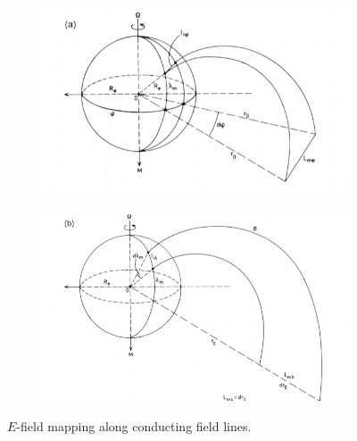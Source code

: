 \begin{figure}[t]
    \centering

    \begin{subfigure}[t]{.49\linewidth}
        \includegraphics[width=.95\linewidth]{bilder/L3_E_field_mapping.png}
        \caption{}\label{fig:E_field_mapping1}
    \end{subfigure}
    \begin{subfigure}[t]{.49\linewidth}
        \includegraphics[width=.95\linewidth]{bilder/L3_E_field_mapping2.png}
        \caption{}\label{fig:E_field_mapping2}
    \end{subfigure}

    \caption{\(E\)-field mapping along conducting field lines.}\label{fig:E_field_mapping}
\end{figure}